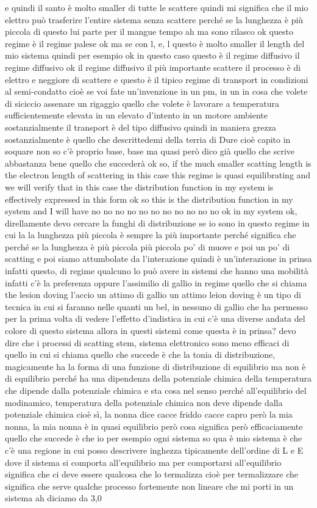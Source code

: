 e quindi il santo è molto smaller di tutte le scattere quindi mi significa che il mio elettro può trasferire l'entire sistema senza scattere perché se la lunghezza è più piccola di questo lui parte per il mangue tempo ah ma sono rilasco ok questo regime è il regime palese ok ma se con l, e, l questo è molto smaller il length del mio sistema quindi per esempio ok in questo caso questo è il regime diffusivo il regime diffusivo ok il regime diffusivo il più importante scattere il processo è di elettro e neggiore di scattere e questo è il tipico regime di transport in condizioni al semi-condatto cioè se voi fate un'invenzione in un pm, in un in cosa che volete di siciccio assenare un rigaggio quello che volete è lavorare a temperatura sufficientemente elevata in un elevato d'intento in un motore ambiente sostanzialmente il transport è del tipo diffusivo quindi in maniera grezza sostanzialmente è quello che descrittedemi della terria di Dure cioè capito in soquare non so c'è proprio base, base ma quasi però dico già quello che scrive abbastanza bene quello che succederà ok so, if the much smaller scatting length is the electron length of scattering in this case this regime is quasi equilibrating and we will verify that in this case the distribution function in my system is effectively expressed in this form ok so this is the distribution function in my system and I will have no no no no no no no no no no no ok in my system ok, direllamente devo cercare la funghi di distribuzione se io sono in questo regime in cui la la lunghezza più piccola è sempre la più importante perché significa che perché se la lunghezza è più piccola più piccola po' di muove e poi un po' di scatting e poi siamo attumbolate da l'interazione quindi è un'interazione in prinsa infatti questo, di regime qualcuno lo può avere in sistemi che hanno una mobilità infatti c'è la preferenza oppure l'assimilio di gallio in regime quello che si chiama the lesion doving l'accio un attimo di gallio un attimo leion doving è un tipo di tecnica in cui si faranno nelle quanti un bel, in nessuno di gallio che ha permesso per la prima volta di vedere l'effetto d'indistica in cui c'è una diverse andata del colore di questo sistema allora in questi sistemi come questa è in prinsa? devo dire che i processi di scatting stem, sistema elettronico sono meno efficaci di quello in cui si chiama quello che succede è che la tonia di distribuzione, magicamente ha la forma di una funzione di distribuzione di equilibrio ma non è di equilibrio perché ha una dipendenza della potenziale chimica della temperatura che dipende dalla potenziale chimica e sta cosa nel senso perché all'equilibrio del modinamico, temperatura della potenziale chimica non deve dipende dalla potenziale chimica cioè sì, la nonna dice cacce friddo cacce capro però la mia nonna, la mia nonna è in quasi equilibrio però cosa significa però efficaciamente quello che succede è che io per esempio ogni sistema so qua è mio sistema è che c'è una regione in cui posso descrivere inghezza tipicamente dell'ordine di L e E dove il sistema si comporta all'equilibrio ma per comportarsi all'equilibrio significa che ci deve essere qualcosa che lo termalizza cioè per termalizzare che significa che serve qualche processo fortemente non lineare che mi porti in un sistema ah diciamo da 3,0 